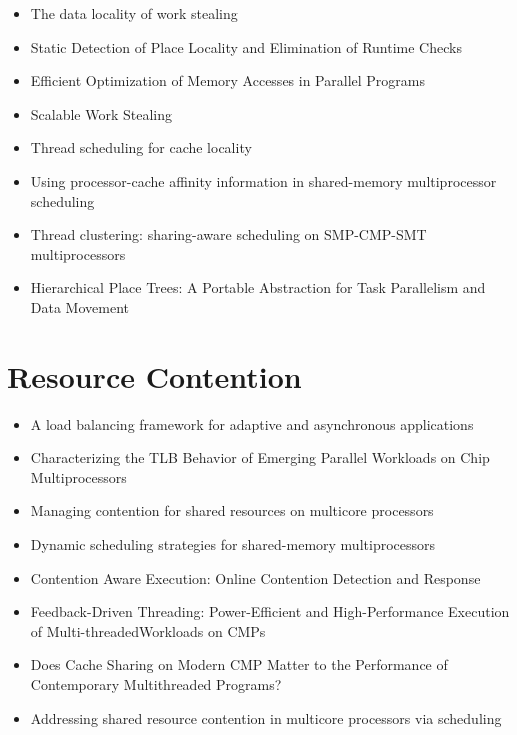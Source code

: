 \begin{itemize}
\item The data locality of work stealing \cite{Acar2002}
\item Static Detection of Place Locality and Elimination of Runtime
  Checks \cite{Agarwal2008}
\item Efficient Optimization of Memory Accesses in Parallel Programs
  \cite{Barik2009}
\item Scalable Work Stealing \cite{Dinan2009}
\item Thread scheduling for cache locality \cite{Philbin1996}
\item Using processor-cache affinity information in shared-memory
  multiprocessor scheduling \cite{Squillante1993}
\item Thread clustering: sharing-aware scheduling on SMP-CMP-SMT
  multiprocessors \cite{Tam2007}
\item Hierarchical Place Trees: A Portable Abstraction for Task
  Parallelism and Data Movement \cite{Yan2009}
\end{itemize}


\section{Resource Contention}
\label{sec:lr-resource-contention}

\begin{itemize}
\item A load balancing framework for adaptive and asynchronous
  applications \cite{Barker2004}
\item Characterizing the TLB Behavior of Emerging Parallel Workloads
  on Chip Multiprocessors \cite{Bhattacharjee2009}
\item Managing contention for shared resources on multicore processors
  \cite{Fedorova2010}
\item Dynamic scheduling strategies for shared-memory multiprocessors
  \cite{Hamidzadeh1996}
\item Contention Aware Execution: Online Contention Detection and
  Response \cite{Soffa2010}
\item Feedback-Driven Threading: Power-Efficient and High-Performance
  Execution of Multi-threadedWorkloads on CMPs \cite{Suleman2008}
\item Does Cache Sharing on Modern CMP Matter to the Performance of
  Contemporary Multithreaded Programs? \cite{Zhang2010}
\item Addressing shared resource contention in multicore processors
  via scheduling \cite{Zhuravlev2010}
\end{itemize}


